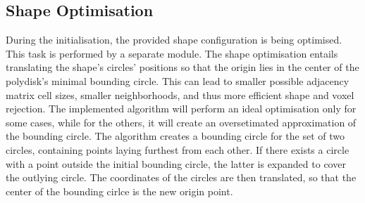 \documentclass[12pt, oneside]{report}
\begin{document}
\subsection{Shape Optimisation}

During the initialisation, the provided shape configuration is being optimised. This task is performed by a separate module. The shape optimisation entails translating the shape's circles' positions so that the origin lies in the center of the polydisk's minimal bounding circle. This can lead to smaller possible adjacency matrix cell sizes, smaller neighborhoods, and thus more efficient shape and voxel rejection. \newline
The implemented algorithm will perform an ideal optimisation only for some cases, while for the others, it will create an oversetimated approximation of the bounding circle. The algorithm creates a bounding circle for the set of two circles, containing points laying furthest from each other. If there exists a circle with a point outside the initial bounding circle, the latter is expanded to cover the outlying circle. The coordinates of the circles are then translated, so that the center of the bounding cirlce is the new origin point.
\end{document}

